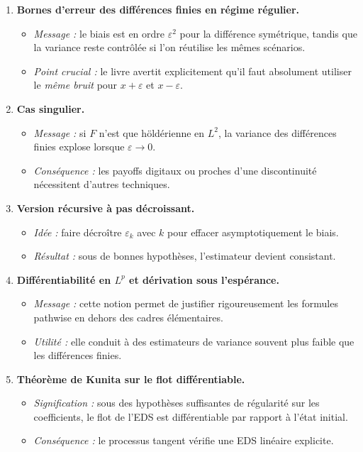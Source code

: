\documentclass[11pt,a4paper]{article}
\begin{document}
\begin{enumerate}[label=\textbf{\arabic*.}]
  \item \textbf{Bornes d'erreur des différences finies en régime régulier.}
  \begin{itemize}
    \item \emph{Message :} le biais est en ordre $\varepsilon^2$ pour la différence symétrique, tandis que la variance reste contrôlée si l'on réutilise les mêmes scénarios.
    \item \emph{Point crucial :} le livre avertit explicitement qu'il faut absolument utiliser le \emph{même bruit} pour $x+\varepsilon$ et $x-\varepsilon$.
  \end{itemize}

  \item \textbf{Cas singulier.}
  \begin{itemize}
    \item \emph{Message :} si $F$ n'est que höldérienne en $L^2$, la variance des différences finies explose lorsque $\varepsilon\to0$.
    \item \emph{Conséquence :} les payoffs digitaux ou proches d'une discontinuité nécessitent d'autres techniques.
  \end{itemize}

  \item \textbf{Version récursive à pas décroissant.}
  \begin{itemize}
    \item \emph{Idée :} faire décroître $\varepsilon_k$ avec $k$ pour effacer asymptotiquement le biais.
    \item \emph{Résultat :} sous de bonnes hypothèses, l'estimateur devient consistant.
  \end{itemize}

  \item \textbf{Différentiabilité en $L^p$ et dérivation sous l'espérance.}
  \begin{itemize}
    \item \emph{Message :} cette notion permet de justifier rigoureusement les formules pathwise en dehors des cadres élémentaires.
    \item \emph{Utilité :} elle conduit à des estimateurs de variance souvent plus faible que les différences finies.
  \end{itemize}

  \item \textbf{Théorème de Kunita sur le flot différentiable.}
  \begin{itemize}
    \item \emph{Signification :} sous des hypothèses suffisantes de régularité sur les coefficients, le flot de l'EDS est différentiable par rapport à l'état initial.
    \item \emph{Conséquence :} le processus tangent vérifie une EDS linéaire explicite.
  \end{itemize}


\end{enumerate}
\end{document}
